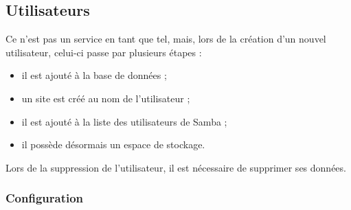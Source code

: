 \subsection{Utilisateurs}
\label{subsec:users}

Ce n'est pas un service en tant que tel, mais, lors de la création d'un nouvel
utilisateur, celui-ci passe par plusieurs étapes :

\begin{itemize}
    \item il est ajouté à la base de données ;
    \item un site est créé au nom de l'utilisateur ;
    \item il est ajouté à la liste des utilisateurs de Samba ;
    \item il possède désormais un espace de stockage.
\end{itemize}

Lors de la suppression de l'utilisateur, il est nécessaire de supprimer ses
données.

\subsubsection{Configuration}
\label{subsubsec:configure}

